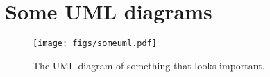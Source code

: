 

\chapter{Some UML diagrams}

\begin{figure}[h]
  \centering
  \texttt{[image: figs/someuml.pdf]}
  \caption{The UML diagram of something that looks important.}
\label{fig:someuml}
\end{figure}
